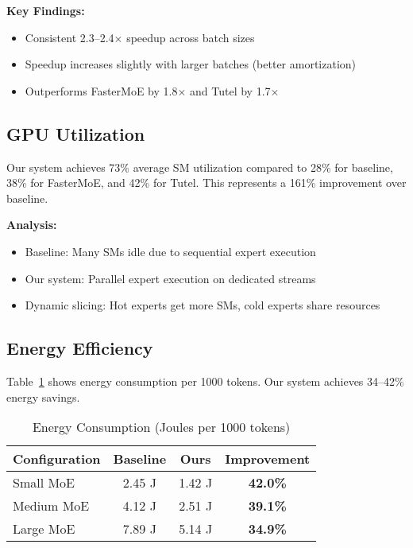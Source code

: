 \documentclass{article}
\begin{document}
\textbf{Key Findings:}
\begin{itemize}
    \item Consistent 2.3--2.4$\times$ speedup across batch sizes
    \item Speedup increases slightly with larger batches (better amortization)
    \item Outperforms FasterMoE by 1.8$\times$ and Tutel by 1.7$\times$
\end{itemize}

\subsection{GPU Utilization}

Our system achieves 73\% average SM utilization compared to 28\% for baseline, 38\% for FasterMoE, and 42\% for Tutel. This represents a 161\% improvement over baseline.

\textbf{Analysis:}
\begin{itemize}
    \item Baseline: Many SMs idle due to sequential expert execution
    \item Our system: Parallel expert execution on dedicated streams
    \item Dynamic slicing: Hot experts get more SMs, cold experts share resources
\end{itemize}

\subsection{Energy Efficiency}

Table~\ref{tab:energy} shows energy consumption per 1000 tokens. Our system achieves 34--42\% energy savings.

\begin{table}[h]
\centering
\caption{Energy Consumption (Joules per 1000 tokens)}
\label{tab:energy}
\begin{tabular}{lccc}
\toprule
Configuration & Baseline & Ours & \textbf{Improvement} \\
\midrule
Small MoE     & 2.45 J   & 1.42 J & \textbf{42.0\%} \\
Medium MoE    & 4.12 J   & 2.51 J & \textbf{39.1\%} \\
Large MoE     & 7.89 J   & 5.14 J & \textbf{34.9\%} \\
\bottomrule
\end{tabular}
\end{table}
\end{document}
